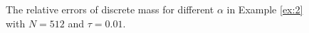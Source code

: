   \begin{figure}[H]
	\begin{center}
	 \caption{The relative errors of discrete mass for different $\alpha$ in Example \ref{ex:2} with $N = 512$ and $\tau=0.01$.} \label{fig:5}
	\end{center}
	\end{figure}
	
